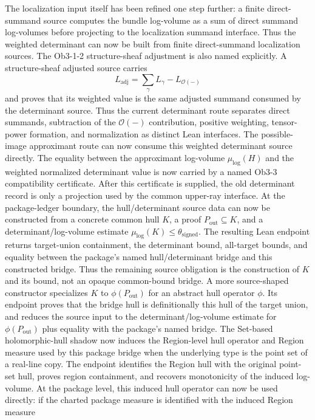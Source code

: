 \documentclass[11pt]{article}
\newcommand{\Lean}{Lean}
\theoremstyle{plain}
\theoremstyle{definition}
\theoremstyle{remark}
\begin{document}
The localization input itself has been refined one step further: a finite
direct-summand source computes the bundle log-volume as a sum of direct
summand log-volumes before projecting to the localization summand interface.
Thus the weighted determinant can now be built from finite direct-summand
localization sources.
The Ob3-1-2 structure-sheaf adjustment is also named explicitly.  A
structure-sheaf adjusted source carries
\[
  L_{\mathrm{adj}}=\sum_\gamma L_\gamma-L_{\mathcal O(-)}
\]
and proves that its weighted value is the same adjusted summand consumed by
the determinant source.  Thus the current determinant route separates direct
summands, subtraction of the \(\mathcal O(-)\) contribution, positive
weighting, tensor-power formation, and normalization as distinct Lean
interfaces.
The possible-image approximant route can now consume this weighted determinant
source directly.  The equality between the approximant log-volume
\(\mu_{\log}(H)\) and the weighted normalized determinant value is now carried
by a named Ob3-3 compatibility certificate.  After this certificate is supplied,
the old determinant record is only a projection used by the common upper-ray
interface.
At the package-ledger boundary, the hull/determinant source data can now be
constructed from a concrete common hull \(K\), a proof
\(P_{\mathrm{out}}\subseteq K\), and a determinant/log-volume estimate
\(\mu_{\log}(K)\le\theta_{\mathrm{signed}}\).  The resulting
\Lean{} endpoint returns target-union containment, the determinant bound,
all-target bounds, and equality between the package's named hull/determinant
bridge and this constructed bridge.  Thus the remaining source obligation is
the construction of \(K\) and its bound, not an opaque common-bound bridge.
A more source-shaped constructor specializes \(K\) to
\(\phi(P_{\mathrm{out}})\) for an abstract hull operator \(\phi\).  Its
endpoint proves that the bridge hull is definitionally this hull of the target
union, and reduces the source input to the determinant/log-volume estimate for
\(\phi(P_{\mathrm{out}})\) plus equality with the package's named bridge.
The Set-based holomorphic-hull shadow now induces the Region-level hull
operator and Region measure used by this package bridge when the underlying
type is the point set of a real-line copy.  The endpoint identifies the
Region hull with the original point-set hull, proves region containment, and
recovers monotonicity of the induced log-volume.
At the package level, this induced hull operator can now be used directly:
if the charted package measure is identified with the induced Region measure
\end{document}
